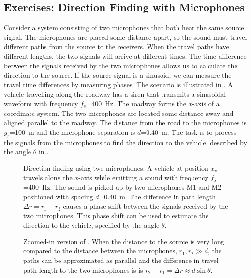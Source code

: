 \subsection*{Exercises: Direction Finding with Microphones}
Consider a system consisting of two microphones that both hear the same source signal. The microphones are placed some distance apart, so the sound must travel different paths from the source to the receivers. When the travel paths have different lengths, the two signals will arrive at different times. 
The time difference between the signals received by the two microphones allows us to calculate the direction to the source. If the source signal is a sinusoid, we can measure the travel time differences by measuring phases.
The scenario is illustrated in . A vehicle travelling along the roadway has a siren that  transmits a sinusoidal waveform with frequency $f_s$=\qty{400}{Hz}. The roadway forms the $x$-axis of a coordinate system.
The two microphones are located some distance away and aligned parallel to the roadway. The distance from the road to the microphones is $y_r$=\qty{100}{m} and the microphone separation is $d$=\qty{0.40}{m}. The task is to process the signals from the microphones to find the direction to the vehicle, described by the angle $\theta$ in .

\begin{figure}[!h]	
\begin{center}
	
	\caption{Direction finding using two microphones. A vehicle at position $x_v$ travels along the $x$-axis while emitting a sound with frequency $f_s$=\qty{400}{Hz}. The sound is picked up by two microphones M1 and M2 positioned with spacing $d$=\qty{0.40}{m}. The difference in path length $\Delta r=r_1-r_2$ causes a phase-shift between the signals received by the two microphones. This phase shift can be used to estimate the direction to the vehicle, specified by the angle $\theta$. }
	\label{fig:overview}
\end{center}
\end{figure}

\begin{figure}[!h]	
\begin{center}
	
	\caption{Zoomed-in version of . When the distance to the source is very long compared to the distance between the microphones, $r_1, r_2 \gg d$, the paths can be approximated as parallel and the difference in travel path length to the two microphones is is 
		$r_2 - r_1 = \Delta r\approx d \sin \theta$. }
	\label{fig:far_field_zoom}
\end{center}
\end{figure}


